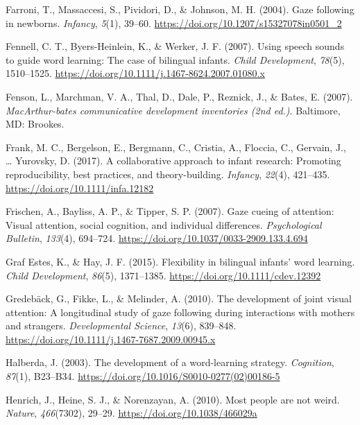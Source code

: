 \documentclass[
  english,
  ,man,floatsintext]{apa6}
\begin{document}
\leavevmode\hypertarget{ref-Farroni_etal_2004}{}%
Farroni, T., Massaccesi, S., Pividori, D., \& Johnson, M. H. (2004). Gaze following in newborns. \emph{Infancy}, \emph{5}(1), 39--60. \url{https://doi.org/10.1207/s15327078in0501_2}

\leavevmode\hypertarget{ref-Fennell_etal_2007}{}%
Fennell, C. T., Byers-Heinlein, K., \& Werker, J. F. (2007). Using speech sounds to guide word learning: The case of bilingual infants. \emph{Child Development}, \emph{78}(5), 1510--1525. \url{https://doi.org/10.1111/j.1467-8624.2007.01080.x}

\leavevmode\hypertarget{ref-Fenson_etal_2007}{}%
Fenson, L., Marchman, V. A., Thal, D., Dale, P., Reznick, J., \& Bates, E. (2007). \emph{MacArthur-bates communicative development inventories (2nd ed.)}. Baltimore, MD: Brookes.

\leavevmode\hypertarget{ref-Frank_etal_2017}{}%
Frank, M. C., Bergelson, E., Bergmann, C., Cristia, A., Floccia, C., Gervain, J., \ldots{} Yurovsky, D. (2017). A collaborative approach to infant research: Promoting reproducibility, best practices, and theory-building. \emph{Infancy}, \emph{22}(4), 421--435. \url{https://doi.org/10.1111/infa.12182}

\leavevmode\hypertarget{ref-Frischen_etal_2007}{}%
Frischen, A., Bayliss, A. P., \& Tipper, S. P. (2007). Gaze cueing of attention: Visual attention, social cognition, and individual differences. \emph{Psychological Bulletin}, \emph{133}(4), 694--724. \url{https://doi.org/10.1037/0033-2909.133.4.694}

\leavevmode\hypertarget{ref-GrafEstes_Hay_2015}{}%
Graf Estes, K., \& Hay, J. F. (2015). Flexibility in bilingual infants' word learning. \emph{Child Development}, \emph{86}(5), 1371--1385. \url{https://doi.org/10.1111/cdev.12392}

\leavevmode\hypertarget{ref-Gredeback_etal_2010}{}%
Gredebäck, G., Fikke, L., \& Melinder, A. (2010). The development of joint visual attention: A longitudinal study of gaze following during interactions with mothers and strangers. \emph{Developmental Science}, \emph{13}(6), 839--848. \url{https://doi.org/10.1111/j.1467-7687.2009.00945.x}

\leavevmode\hypertarget{ref-Halberda_2003}{}%
Halberda, J. (2003). The development of a word-learning strategy. \emph{Cognition}, \emph{87}(1), B23--B34. \url{https://doi.org/10.1016/S0010-0277(02)00186-5}

\leavevmode\hypertarget{ref-Henrich_etal_2010}{}%
Henrich, J., Heine, S. J., \& Norenzayan, A. (2010). Most people are not weird. \emph{Nature}, \emph{466}(7302), 29--29. \url{https://doi.org/10.1038/466029a}
\end{document}
